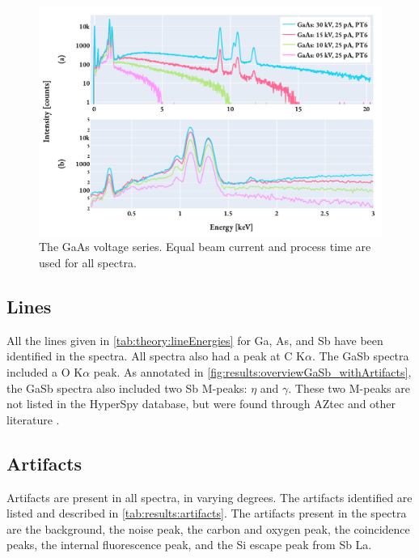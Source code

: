 \begin{figure}[hbtp]
    \centering
    \includegraphics[width=0.9\linewidth]{figures/results/GaAs_voltages.pdf}
    \caption{
        The GaAs voltage series.
        Equal beam current and process time are used for all spectra.
    }
    \label{fig:results:GaAs_voltages}
\end{figure}



\subsection*{Lines}
\label{results:qualitative_analysis:lines}

All the lines given in \cref{tab:theory:lineEnergies} for Ga, As, and Sb have been identified in the spectra.
All spectra also had a peak at C K$\alpha$.
The GaSb spectra included a O K$\alpha$ peak.
As annotated in \cref{fig:results:overviewGaSb_withArtifacts}, the GaSb spectra also included two Sb M-peaks: $\eta$ and $\gamma$.
These two M-peaks are not listed in the HyperSpy database, but were found through AZtec \cite{aztec_manual} and other literature \cite{liao2006practical}.






\subsection*{Artifacts}
\label{results:qualitative_analysis:artifacts}

Artifacts are present in all spectra, in varying degrees.
The artifacts identified are listed and described in \cref{tab:results:artifacts}.
The artifacts present in the spectra are the background, the noise peak, the carbon and oxygen peak, the coincidence peaks, the internal fluorescence peak, and the Si escape peak from Sb La.

